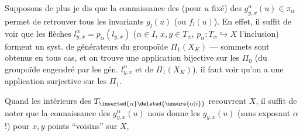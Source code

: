 
Supposons de plus    je dis que la connaissance des (pour $u$ fixé) des $g_{y,x}^\alpha(u)\in\pi_\alpha$  permet de retrouver tous les invariants $g_l(u)$ (ou $f_l(u)$). En effet, il suffit de voir que les flèches $l_{y,x}^\alpha=p_\alpha(l_{y,x})$ ($\alpha\in I$, $x,y\in T_\alpha$, $p_\alpha:T_\alpha\hookrightarrow X$ l'inclusion)  forment un syst. de générateurs du groupoïde $\Pi_1(X_K)$ ---    sommets sont obtenus en tous cas, et on trouve une application bijective sur les $\Pi_0$ (du groupoïde engendré par les gén. $l_{y,x}^\alpha$  et de $\Pi_1(X_K)$), il faut voir qu'on a une application surjective sur les $\Pi_1$.

Quand les intérieurs des $T_{\inserted{\alpha}\deleted{\unsure{\alpha|i}}}$ recouvrent $X$, il suffit de noter que la connaissance des $g_{y,x}^{\alpha}(u)$ nous donne les $g_{y,x}(u)$ (sans exposant $\alpha$ !) pour $x,y$ points ``voisins'' sur $X$,

